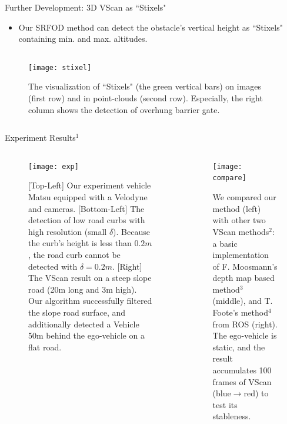 \documentclass[final,hyperref={pdfpagelabels=false}]{beamer}
\begin{document}
\begin{frame}[t]
\begin{columns}[t]
\begin{column}{.48\textwidth}
\begin{block}{Further Development: 3D VScan as ``Stixels"}
	\begin{itemize}
		\item Our SRFOD method can detect the obstacle's vertical height as ``Stixels" containing min. and max. altitudes.
	\end{itemize}	
	\begin{center}
		\begin{column}{0.8\textwidth}
			\begin{figure}
				\centering
				\texttt{[image: stixel]}
				\caption{The visualization of ``Stixels" (the green vertical bars) on images (first row) and in point-clouds (second row). Especially, the right column shows the detection of overhung barrier gate.}
			\end{figure}	
		\end{column}
	\end{center}
		
\end{block}


\begin{block}{Experiment Results$^1$}

\begin{columns}
	\begin{column}{0.573\textwidth}
		\begin{figure}
			\centering
			\texttt{[image: exp]}
			\caption{[Top-Left] Our experiment vehicle Matsu equipped with a Velodyne and cameras. [Bottom-Left] The detection of low road curbs with high resolution (small $\delta$). Because the curb's height is less than $0.2m$, the road curb cannot be detected with $\delta=0.2m$. [Right] The VScan result on a steep slope road (20m long and 3m high). Our algorithm successfully filtered the slope road surface, and additionally detected a Vehicle 50m behind the ego-vehicle on a flat road.}
		\end{figure}
	\end{column}
	\begin{column}{0.36\textwidth}
		\begin{figure}
			\centering
			\texttt{[image: compare]}
			\caption{We compared our method (left) with other two VScan methods$^2$: a basic implementation of F. Moosmann's depth map based method$^3$ (middle), and T. Foote's method$^4$ from ROS (right). The ego-vehicle is static, and the result accumulates 100 frames of VScan (blue$\rightarrow$red) to test its stableness.}
		\end{figure}
	\end{column}
\end{columns}


\end{block}
\end{column}
\end{columns}
\end{frame}
\end{document}
